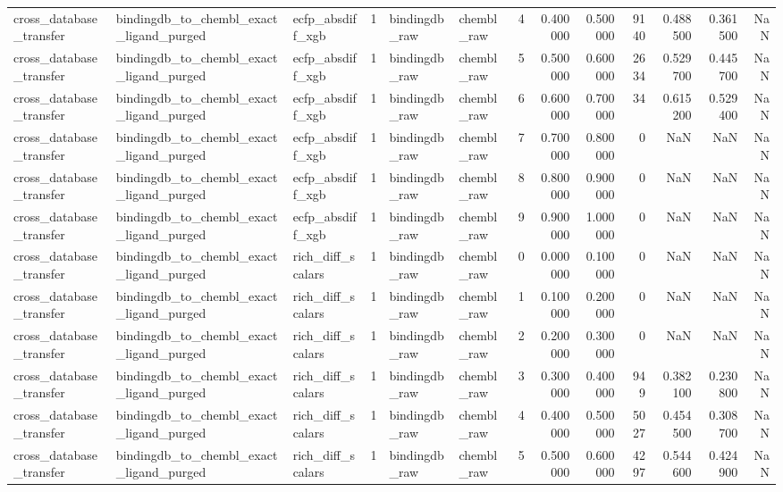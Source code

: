 \begin{longtable}{lllrllrrrrrrr}
cross\_database\_transfer & bindingdb\_to\_chembl\_exact\_ligand\_purged & ecfp\_absdiff\_xgb & 1 & bindingdb\_raw & chembl\_raw & 4 & 0.400000 & 0.500000 & 9140 & 0.488500 & 0.361500 & NaN \\
cross\_database\_transfer & bindingdb\_to\_chembl\_exact\_ligand\_purged & ecfp\_absdiff\_xgb & 1 & bindingdb\_raw & chembl\_raw & 5 & 0.500000 & 0.600000 & 2634 & 0.529700 & 0.445700 & NaN \\
cross\_database\_transfer & bindingdb\_to\_chembl\_exact\_ligand\_purged & ecfp\_absdiff\_xgb & 1 & bindingdb\_raw & chembl\_raw & 6 & 0.600000 & 0.700000 & 34 & 0.615200 & 0.529400 & NaN \\
cross\_database\_transfer & bindingdb\_to\_chembl\_exact\_ligand\_purged & ecfp\_absdiff\_xgb & 1 & bindingdb\_raw & chembl\_raw & 7 & 0.700000 & 0.800000 & 0 & NaN & NaN & NaN \\
cross\_database\_transfer & bindingdb\_to\_chembl\_exact\_ligand\_purged & ecfp\_absdiff\_xgb & 1 & bindingdb\_raw & chembl\_raw & 8 & 0.800000 & 0.900000 & 0 & NaN & NaN & NaN \\
cross\_database\_transfer & bindingdb\_to\_chembl\_exact\_ligand\_purged & ecfp\_absdiff\_xgb & 1 & bindingdb\_raw & chembl\_raw & 9 & 0.900000 & 1.000000 & 0 & NaN & NaN & NaN \\
cross\_database\_transfer & bindingdb\_to\_chembl\_exact\_ligand\_purged & rich\_diff\_scalars & 1 & bindingdb\_raw & chembl\_raw & 0 & 0.000000 & 0.100000 & 0 & NaN & NaN & NaN \\
cross\_database\_transfer & bindingdb\_to\_chembl\_exact\_ligand\_purged & rich\_diff\_scalars & 1 & bindingdb\_raw & chembl\_raw & 1 & 0.100000 & 0.200000 & 0 & NaN & NaN & NaN \\
cross\_database\_transfer & bindingdb\_to\_chembl\_exact\_ligand\_purged & rich\_diff\_scalars & 1 & bindingdb\_raw & chembl\_raw & 2 & 0.200000 & 0.300000 & 0 & NaN & NaN & NaN \\
cross\_database\_transfer & bindingdb\_to\_chembl\_exact\_ligand\_purged & rich\_diff\_scalars & 1 & bindingdb\_raw & chembl\_raw & 3 & 0.300000 & 0.400000 & 949 & 0.382100 & 0.230800 & NaN \\
cross\_database\_transfer & bindingdb\_to\_chembl\_exact\_ligand\_purged & rich\_diff\_scalars & 1 & bindingdb\_raw & chembl\_raw & 4 & 0.400000 & 0.500000 & 5027 & 0.454500 & 0.308700 & NaN \\
cross\_database\_transfer & bindingdb\_to\_chembl\_exact\_ligand\_purged & rich\_diff\_scalars & 1 & bindingdb\_raw & chembl\_raw & 5 & 0.500000 & 0.600000 & 4297 & 0.544600 & 0.424900 & NaN \\

\end{longtable}
